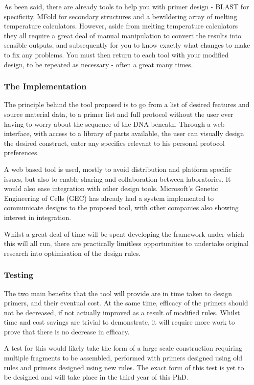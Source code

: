 \documentclass[../main.tex]{subfiles}
\begin{document}
As been said, there are already tools to help you with primer design - BLAST for specificity, MFold for secondary structures and a bewildering array of melting temperature calculators. However, aside from melting temperature calculators they all require a great deal of manual manipulation to convert the results into sensible outputs, and subsequently for you to know exactly what changes to make to fix any problems. You must then return to each tool with your modified design, to be repeated as necessary - often a great many times.

\subsubsection{The Implementation}

The principle behind the tool proposed is to go from a list of desired features and source material data, to a primer list and full protocol without the user ever having to worry about the sequence of the DNA beneath. Through a web interface, with access to a library of parts available, the user can visually design the desired construct, enter any specifics relevant to his personal protocol preferences.

A web based tool is used, mostly to avoid distribution and platform specific issues, but also to enable sharing and collaboration between laboratories. It would also ease integration with other design tools. Microsoft's Genetic Engineering of Cells (GEC) has already had a system implemented to communicate designs to the proposed tool, with other companies also showing interest in integration.

Whilst a great deal of time will be spent developing the framework under which this will all run, there are practically limitless opportunities to undertake original research into optimisation of the design rules.

\subsubsection{Testing}

The two main benefits that the tool will provide are in time taken to design primers, and their eventual cost. At the same time, efficacy of the primers should not be decreased, if not actually improved as a result of modified rules. Whilst time and cost savings are trivial to demonstrate, it will require more work to prove that there is no decrease in efficacy.

A test for this would likely take the form of a large scale construction requiring multiple fragments to be assembled, performed with primers designed using old rules and primers designed using new rules. The exact form of this test is yet to be designed and will take place in the third year of this PhD.
\end{document}
